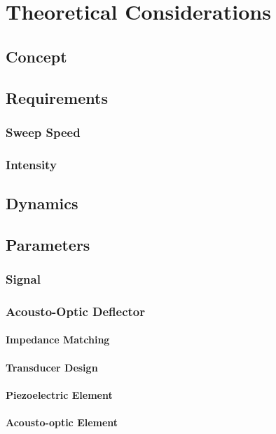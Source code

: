 \chapter{Theoretical Considerations}

\section{Concept}

\section{Requirements}

\subsection{Sweep Speed}

\subsection{Intensity}

\section{Dynamics}

\section{Parameters}

\subsection{Signal}

\subsection{Acousto-Optic Deflector}

\subsubsection{Impedance Matching}
\subsubsection{Transducer Design}
\subsubsection{Piezoelectric Element}
\subsubsection{Acousto-optic Element}
